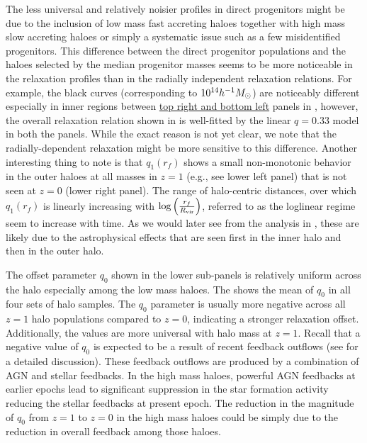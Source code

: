 The less universal and relatively noisier profiles in direct progenitors might be due to the inclusion of low mass fast accreting haloes together with high mass slow accreting haloes or simply a systematic issue such as a few misidentified progenitors. This difference between the direct progenitor populations and the haloes selected by the median progenitor masses seems to be more noticeable in the relaxation profiles than in the radially independent relaxation relations. For example, the black curves (corresponding to $10^{14} h^{-1}M_{\odot}$) are noticeably different especially in inner regions between \underline{top right and bottom left} panels in , however, the overall relaxation relation shown in  is well-fitted by the linear $q=0.33$ model in both the panels. %
While the exact reason is not yet clear, we note that the radially-dependent relaxation might be more sensitive to this difference. 
Another interesting thing to note is that $q_1(r_f)$ shows a small non-monotonic behavior in the outer haloes at all masses in $z=1$ (e.g., see lower left panel) that is not seen at $z=0$ (lower right panel).
The range of halo-centric distances, over which $q_1(r_f)$ is linearly increasing with $\log \left( \frac{r_f}{R_{\rm{vir}}} \right) $, referred to as the loglinear regime seem to increase with time. As we would later see from the analysis in , these are likely due to the astrophysical effects that are seen first in the inner halo and then in the outer halo. %

The offset parameter $q_0$ shown in the lower sub-panels is relatively uniform across the halo especially among the low mass haloes. The  shows the mean of $q_0$ in all four sets of halo samples. The $q_0$ parameter is usually more negative across all $z=1$ halo populations compared to $z=0$, indicating a stronger relaxation offset. Additionally, the values are more universal with halo mass at $z=1$. Recall that a negative value of $q_0$ is expected to be a result of recent feedback outflows (see  for a detailed discussion). These feedback outflows are produced by a combination of AGN and stellar feedbacks. In the high mass haloes, powerful AGN feedbacks at earlier epochs lead to significant suppression in the star formation activity reducing the stellar feedbacks at present epoch. The reduction in the magnitude of $q_0$ from $z=1$ to $z=0$ in the high mass haloes could be simply due to the reduction in overall feedback among those haloes.
~%



